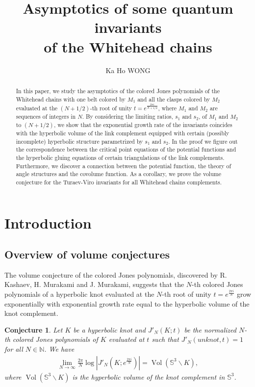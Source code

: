 \documentclass[10pt,a4paper]{article}
\title{Asymptotics of some quantum invariants\\ of the Whitehead chains}
\author{Ka Ho WONG}
\date{}
\def\Vol{\operatorname{Vol}}
\newtheorem{conjecture}{Conjecture}
\def\SS{{\mathbb S}}
\def\NN{{\mathbb N}}
\def\Vol{\operatorname{Vol}}
\begin{document}
\maketitle

\begin{abstract}
In this paper, we study the asymptotics of the colored Jones polynomials of the Whitehead chains with one belt colored by $M_1$ and all the clasps colored by $M_2$ evaluated at the $(N+1/2)$-th root of unity $t=e^{\frac{2\pi i}{N+1/2}}$, where $M_1$ and $M_2$ are sequences of integers in $N$. By considering the limiting ratios, $s_1$ and $s_2$, of $M_1$ and $M_2$ to $(N+1/2)$, we show that the exponential growth rate of the invariants coincides with the hyperbolic volume of the link complement equipped with certain (possibly incomplete) hyperbolic structure parametrized by $s_1$ and $s_2$. In the proof we figure out the correspondence between the critical point equations of the potential functions and the hyperbolic gluing equations of certain triangulations of the link complements. Furthermore, we discover a connection between the potential function, the theory of angle structures and the covolume function. As a corollary, we prove the volume conjecture for the Turaev-Viro invariants for all Whitehead chains complements. 

\end{abstract}

\section{Introduction}

\subsection{Overview of volume conjectures}
The volume conjecture of the colored Jones polynomials, discovered by R. Kashaev, H. Murakami and J. Murakami, suggests that the $N$-th colored Jones polynomials of a hyperbolic knot evaluated at the $N$-th root of unity $t=e^{\frac{2\pi i}{N}}$ grow exponentially with exponential growth rate equal to the hyperbolic volume of the knot complement.

\begin{conjecture}\label{cvc}\cite{K97,MM01} Let $K$ be a hyperbolic knot and $J'_{N}(K;t)$ be the normalized $N$-th colored Jones polynomials of $K$ evaluated at $t$ such that $J'_N(unknot,t)=1$ for all $N\in \NN$. We have
\begin{align*}
\lim_{N \to \infty} \frac{2\pi}{N} \log|J'_{N}(K;e^{\frac{2\pi i}{N}})| = \Vol(\SS^{3} \backslash K),
\end{align*}
where $\operatorname{Vol}(\SS^{3} \backslash K)$ is the hyperbolic volume of the knot complement in $\SS^3$.
\end{conjecture}
\end{document}
